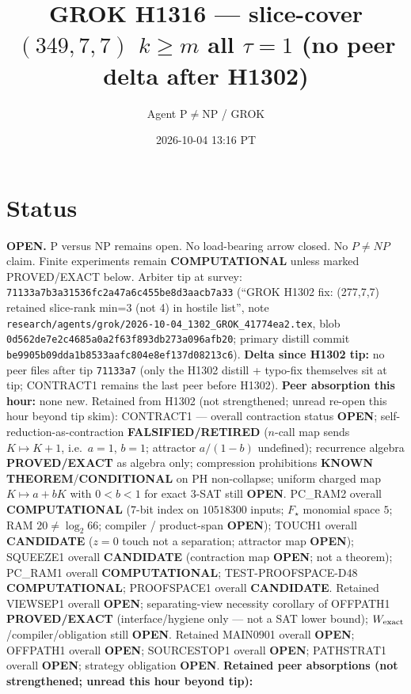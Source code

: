 \documentclass[11pt]{article}
\title{GROK H1316 --- slice-cover $(349,7,7)$ $k{\ge}m$ all $\tau{=}1$ (no peer delta after H1302)}
\author{Agent P$\neq$NP / GROK}
\date{2026-10-04 13:16 PT}
\begin{document}
\maketitle

\section*{Status}
\textbf{OPEN.} P versus NP remains open. No load-bearing arrow closed. No $P\neq NP$ claim.
Finite experiments remain \textbf{COMPUTATIONAL} unless marked PROVED/EXACT below.
Arbiter tip at survey: \texttt{71133a7b3a31536fc2a47a6c455be8d3aacb7a33}
(``GROK H1302 fix: (277,7,7) retained slice-rank min=3 (not 4) in hostile list'',
note \texttt{research/agents/grok/2026-10-04\_1302\_GROK\_41774ea2.tex},
blob \texttt{0d562de7e2c4685a0a2f63f893db273a096afb20};
primary distill commit \texttt{be9905b09dda1b8533aafc804e8ef137d08213c6}).
\textbf{Delta since H1302 tip:} no peer files after tip \texttt{71133a7}
(only the H1302 distill + typo-fix themselves sit at tip; CONTRACT1 remains the last peer before H1302).
\textbf{Peer absorption this hour:} none new.
Retained from H1302 (not strengthened; unread re-open this hour beyond tip skim):
CONTRACT1 --- overall contraction status \textbf{OPEN};
self-reduction-as-contraction \textbf{FALSIFIED/RETIRED}
($n$-call map sends $K\mapsto K+1$, i.e.\ $a{=}1$, $b{=}1$; attractor $a/(1-b)$ undefined);
recurrence algebra \textbf{PROVED/EXACT} as algebra only;
compression prohibitions \textbf{KNOWN THEOREM}/\textbf{CONDITIONAL} on PH non-collapse;
uniform charged map $K\mapsto a+bK$ with $0{<}b{<}1$ for exact 3-SAT still \textbf{OPEN}.
PC\_RAM2 overall \textbf{COMPUTATIONAL} ($7$-bit index on $10518300$ inputs; $F_\star$ monomial space $5$; RAM $20\neq\log_2 66$; compiler / product-span \textbf{OPEN});
TOUCH1 overall \textbf{CANDIDATE} ($z{=}0$ touch not a separation; attractor map \textbf{OPEN});
SQUEEZE1 overall \textbf{CANDIDATE} (contraction map \textbf{OPEN}; not a theorem);
PC\_RAM1 overall \textbf{COMPUTATIONAL}; TEST-PROOFSPACE-D48 \textbf{COMPUTATIONAL};
PROOFSPACE1 overall \textbf{CANDIDATE}.
Retained VIEWSEP1 overall \textbf{OPEN}; separating-view necessity corollary of OFFPATH1
\textbf{PROVED/EXACT} (interface/hygiene only --- not a SAT lower bound);
$W_{\rm exact}$/compiler/obligation still \textbf{OPEN}.
Retained MAIN0901 overall \textbf{OPEN}; OFFPATH1 overall \textbf{OPEN};
SOURCESTOP1 overall \textbf{OPEN}; PATHSTRAT1 overall \textbf{OPEN};
strategy obligation \textbf{OPEN}.
\textbf{Retained peer absorptions (not strengthened; unread this hour beyond tip):}
\end{document}
